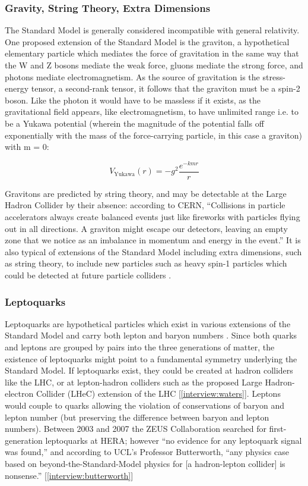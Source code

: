 \subsubsection{Gravity, String Theory, Extra Dimensions}
The Standard Model is generally considered incompatible with general relativity. One proposed extension of the Standard Model is the graviton, a hypothetical elementary particle which mediates the force of gravitation \textendash in the same way that the W and Z bosons mediate the weak force, gluons mediate the strong force, and photons mediate electromagnetism. As the source of gravitation is the stress-energy tensor, a second-rank tensor, it follows that the graviton must be a spin-2 boson. Like the photon it would have to be massless if it exists, as the gravitational field appears, like electromagnetism, to have unlimited range \textendash i.e. to be a Yukawa potential (wherein the magnitude of the potential falls off exponentially with the mass of the force-carrying particle, in this case a graviton) with m = 0:

\begin{equation*}
V_\text{Yukawa}(r)= -g^2\frac{e^{-kmr}}{r}
\end{equation*}

Gravitons are predicted by string theory, and may be detectable at the Large Hadron Collider by their absence: according to CERN, ``Collisions in particle accelerators always create balanced events \textendash just like fireworks \textendash with particles flying out in all directions. A graviton might escape our detectors, leaving an empty zone that we notice as an imbalance in momentum and energy in the event.'' \cite{CERN:Gravitons:Online,deAquino:Gravitons} It is also typical of extensions of the Standard Model including extra dimensions, such as string theory, to include new particles such as heavy spin-1 particles which could be detected at future particle colliders \cite{CLIC:Concept}.

\subsubsection{Leptoquarks}
Leptoquarks are hypothetical particles which exist in various extensions of the Standard Model and carry both lepton and baryon numbers \cite{PDG:Leptoquark}. Since both quarks and leptons are grouped by pairs into the three generations of matter, the existence of leptoquarks might point to a fundamental symmetry underlying the Standard Model. If leptoquarks exist, they could be created at hadron colliders like the LHC, or at lepton-hadron colliders such as the proposed Large Hadron-electron Collider (LHeC) extension of the LHC [\ref{interview:waters}]. Leptons would couple to quarks \textendash allowing the violation of conservations of baryon and lepton number (but preserving the difference between baryon and lepton numbers). Between 2003 and 2007 the ZEUS Collaboration searched for first-generation leptoquarks at HERA; however ``no evidence for any leptoquark signal was found,'' \cite{ZEUS:Leptoquark} and according to UCL's Professor Butterworth, ``any physics case based on beyond-the-Standard-Model physics for [a hadron-lepton collider] is nonsense.'' [\ref{interview:butterworth}]
